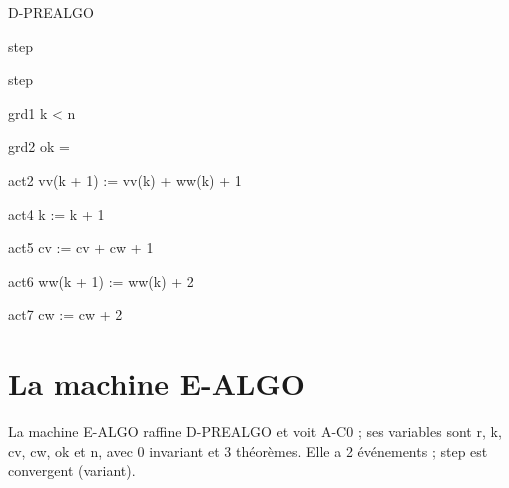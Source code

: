 \documentclass[11pt,a4paper]{article}
\begin{document}
\begin{machine}{D-PREALGO}
  \begin{event}[convergent]{step}
    \begin{refines} step \end{refines}
    \begin{guard}{grd1} k < n \end{guard}
    \begin{guardth}{grd2} ok = \False \end{guardth}
    \begin{action}{act2} vv(k + 1) := vv(k) + ww(k) + 1 \end{action}
    \begin{action}{act4} k := k + 1 \end{action}
    \begin{action}{act5} cv := cv + cw + 1 \end{action}
    \begin{action}{act6} ww(k + 1) := ww(k) + 2 \end{action}
    \begin{action}{act7} cw := cw + 2 \end{action}
  \end{event}
\end{machine}

\section{La machine E-ALGO}

La machine \textsf{E-ALGO} raffine \textsf{D-PREALGO} et voit \textsf{A-C0} ; ses variables sont \textsf{r}, \textsf{k}, \textsf{cv}, \textsf{cw}, \textsf{ok} et \textsf{n}, avec 0 invariant et 3 théorèmes. Elle a 2 événements ; \textsf{step} est convergent (variant).
\end{document}

